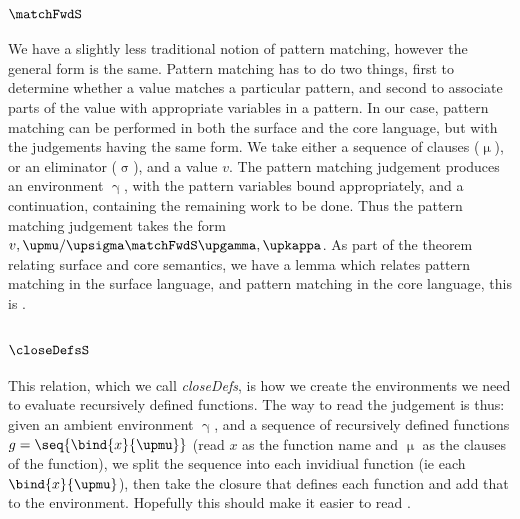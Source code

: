 \subsubsection{$\matchFwdS$}
We have a slightly less traditional notion of pattern matching, however the general form is the same.
Pattern matching has to do two things, first to determine whether a value matches a particular pattern,
and second to associate parts of the value with appropriate variables in a pattern. 
In our case, pattern matching can be performed in both the surface and the core language,
but with the judgements having the same form. We take either a sequence of clauses ($\upmu$), or
an eliminator ($\upsigma$), and a value $v$. The pattern matching judgement produces
an environment $\upgamma$, with the pattern variables bound appropriately, and a continuation,
containing the remaining work to be done. Thus the pattern matching judgement takes the form
$v, \upmu / \upsigma \matchFwdS \upgamma, \upkappa$. As part of the theorem relating surface and
core semantics, we have a lemma which relates pattern matching in the surface language, 
and pattern matching in the core language, this is .

\subsubsection{$\closeDefsS$}
This relation, which we call \textit{closeDefs}, is how we create the environments we need to 
evaluate recursively defined functions. The way to read the judgement is thus: given an
ambient environment $\upgamma$, and a sequence of recursively defined functions $g = \seq{\bind{x}{\upmu}}$
(read $x$ as the function name and $\upmu$ as the clauses of the function), we split the sequence into
each invidiual function (ie each $\bind{x}{\upmu}$), then take the closure that defines each function
and add that to the environment. Hopefully this should make it easier to read .
\clearpage
